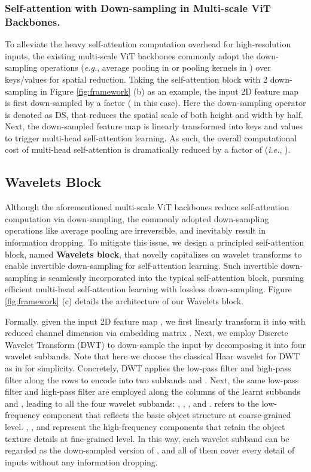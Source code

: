 \documentclass[runningheads]{llncs}
\begin{document}
\subsubsection{Self-attention with Down-sampling in Multi-scale ViT Backbones.}
To alleviate the heavy self-attention computation overhead for high-resolution inputs, the existing multi-scale ViT backbones commonly adopt the down-sampling operations (\emph{e.g.}, average pooling in \cite{wang2021pvtv2} or pooling kernels in \cite{fan2021multiscale}) over keys/values for spatial reduction. Taking the self-attention block with 2 down-sampling in Figure \ref{fig:framework} (b) as an example, the input 2D feature map  is first down-sampled by a factor  ( in this case). Here the down-sampling operator is denoted as DS, that reduces the spatial scale of both height and width by half. Next, the down-sampled feature map is linearly transformed into keys  and values  to trigger multi-head self-attention learning. As such, the overall computational cost of multi-head self-attention is dramatically reduced by a factor of  (\emph{i.e.}, ).


\subsection{Wavelets Block}
Although the aforementioned multi-scale ViT backbones reduce self-attention computation via down-sampling, the commonly adopted down-sampling operations like average pooling are irreversible, and inevitably result in information dropping. To mitigate this issue, we design a principled self-attention block, named \textbf{Wavelets block}, that novelly capitalizes on wavelet transforms to enable invertible down-sampling for self-attention learning. Such invertible down-sampling is seamlessly incorporated into the typical self-attention block, pursuing efficient multi-head self-attention learning with lossless down-sampling. Figure \ref{fig:framework} (c) details the architecture of our Wavelets block.

Formally, given the input 2D feature map , we first linearly transform it into  with reduced channel dimension via embedding matrix . Next, we employ Discrete Wavelet Transform (DWT) to down-sample the input  by decomposing it into four wavelet subbands. Note that here we choose the classical Haar wavelet for DWT as in \cite{liu2020wavelet} for simplicity. Concretely, DWT applies the low-pass filter  and high-pass filter  along the rows to encode  into two subbands  and . Next, the same low-pass filter  and high-pass filter  are employed along the columns of the learnt subbands  and , leading to all the four wavelet subbands: , , , and .  refers to the low-frequency component that reflects the basic object structure at coarse-grained level. , , and  represent the high-frequency components that retain the object texture details at fine-grained level. In this way, each wavelet subband can be regarded as the down-sampled version of , and all of them cover every detail of inputs without any information dropping.
\end{document}

